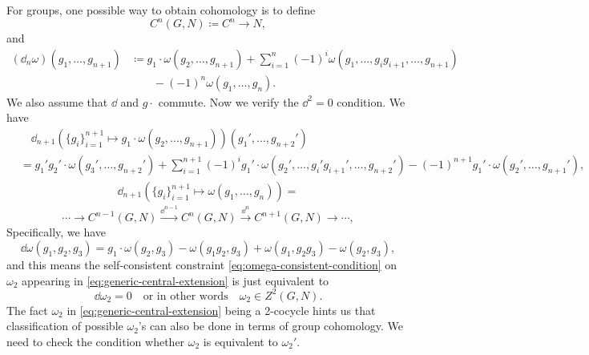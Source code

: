 \documentclass[hyperref, a4paper]{article}
\begin{document}
For groups, one possible way to obtain cohomology is to define 
\begin{equation}
    C^n(G, N) \coloneqq C^n \to N,
\end{equation}
and 
\begin{equation}
    \begin{aligned}
        (\dd_n \omega)(g_1, \ldots, g_{n+1}) &\coloneqq g_1 \cdot \omega(g_2, \ldots, g_{n+1}) + \sum_{i=1}^{n} (-1)^i \omega(g_1, \ldots, g_i g_{i+1}, \ldots, g_{n+1})  \\
        &\quad \quad - (-1)^n \omega(g_1, \ldots, g_n).
    \end{aligned}
\end{equation}
We also assume that $\dd$ and $g \cdot$ commute.
Now we verify the $\dd^2 = 0$ condition. We have 
\[
    \begin{aligned}
        &\quad\dd_{n+1} (\{g_i\}_{i=1}^{n+1} \mapsto g_1 \cdot \omega(g_2, \ldots, g_{n+1})) (g_1', \ldots, g_{n+2}') \\
        &= g_1' g_2' \cdot \omega(g_3', \ldots, g_{n+2}') + \sum_{i=1}^{n+1} (-1)^i g_1' \cdot \omega(g_2', \ldots, g_i' g_{i+1}', \ldots, g_{n+2}') - (-1)^{n+1} g_1' \cdot \omega(g_2', \ldots, g_{n+1}'),
    \end{aligned}
\]
\[
    \begin{aligned}
        \dd_{n+1} (\{g_i\}_{i=1}^{n+1} \mapsto \omega(g_1, \ldots, g_n)) = 
    \end{aligned}
\]
\begin{equation}
    \cdots \to C^{n-1}(G, N) \stackrel{\dd^{n-1}}{\longrightarrow} C^n(G, N) \stackrel{\dd^n}{\longrightarrow} C^{n+1}(G, N) \to \cdots ,
\end{equation}
Specifically, we have 
\begin{equation}
    \dd{\omega}(g_1, g_2, g_3) = g_1 \cdot \omega(g_2, g_3) - \omega(g_1 g_2, g_3) + \omega(g_1, g_2 g_3) - \omega(g_2, g_3),
\end{equation}
and this means the self-consistent constraint \eqref{eq:omega-consistent-condition} on $\omega_2$ 
appearing in \eqref{eq:generic-central-extension} is just equivalent to 
\begin{equation}
    \dd{\omega_2} = 0 \quad \text{or in other words} \quad \omega_2 \in Z^2(G, N).
\end{equation}
The fact $\omega_2$ in \eqref{eq:generic-central-extension} being a 2-cocycle hints us that 
classification of possible $\omega_2$'s can also be done in terms of group cohomology.
We need to check the condition whether $\omega_2$ is equivalent to $\omega_2'$. 
\end{document}

